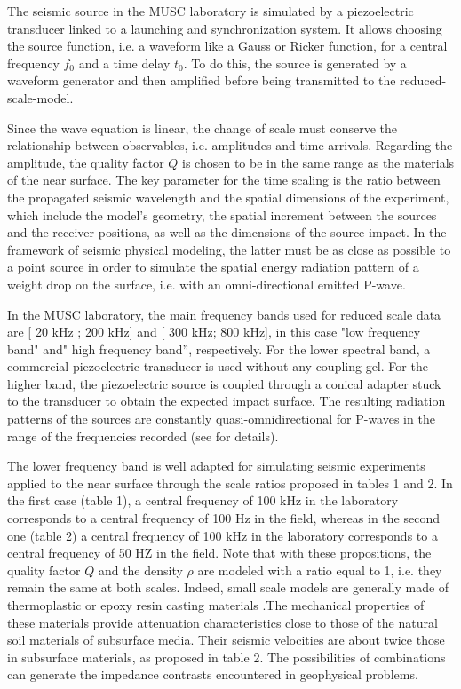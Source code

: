 \documentclass[paper,extra]{gji} %
\begin{document}
\noindent The seismic source in the MUSC laboratory is simulated by a piezoelectric transducer linked to a launching and synchronization system. It allows choosing the source function, i.e. a waveform like a Gauss or Ricker function, for a central frequency $f_{0}$ and a time delay $t_{0}$. To do this, the source is generated by a waveform generator and then amplified before being transmitted to the reduced-scale-model.

\noindent Since the wave equation is linear, the change of scale must conserve the relationship between observables, i.e. amplitudes and time arrivals. Regarding the amplitude, the quality factor $Q$ is chosen to be in the same range as the materials of the near surface. The key parameter for the time scaling is the ratio between the propagated seismic wavelength and the spatial dimensions of the experiment, which include the model’s geometry, the spatial increment between the sources and the receiver positions, as well as the dimensions of the source impact. In the framework of seismic physical modeling, the latter must be as close as possible to a point source in order to simulate the spatial energy radiation pattern of a weight drop on the surface, i.e. with an omni-directional emitted P-wave.

\noindent In the MUSC laboratory, the main frequency bands used for reduced scale data are [ 20 kHz ; 200 kHz] and [ 300 kHz; 800 kHz], in this case "low frequency band" and" high frequency band”, respectively. For the lower spectral band, a commercial piezoelectric transducer is used without any coupling gel. For the higher band, the piezoelectric source is coupled through a conical adapter stuck to the transducer to obtain the expected impact surface. The resulting radiation patterns of the sources are constantly quasi-omnidirectional for P-waves in the range of the frequencies recorded (see \citet{Bretaudeau_SSM_2011} for details).

\noindent The lower frequency band is well adapted for simulating seismic experiments applied to the near surface through the scale ratios proposed in tables 1 and 2. In the first case (table 1), a central frequency of 100 kHz in the laboratory corresponds to a central frequency of 100 Hz in the field, whereas in the second one (table 2) a central frequency of 100 kHz in the laboratory corresponds to a central frequency of 50 HZ in the field. Note that with these propositions, the quality factor $Q$ and the density $\rho$ are modeled with a ratio equal to 1, i.e. they remain the same at both scales. Indeed, small scale models are generally made of thermoplastic or epoxy resin casting materials \citep{Bretaudeau_FWI_2013}.The mechanical properties of these materials provide attenuation characteristics close to those of the natural soil materials of subsurface media. Their seismic velocities are about twice those in subsurface materials, as proposed in table 2. The possibilities of combinations can generate the impedance contrasts encountered in geophysical problems. 
\end{document}
